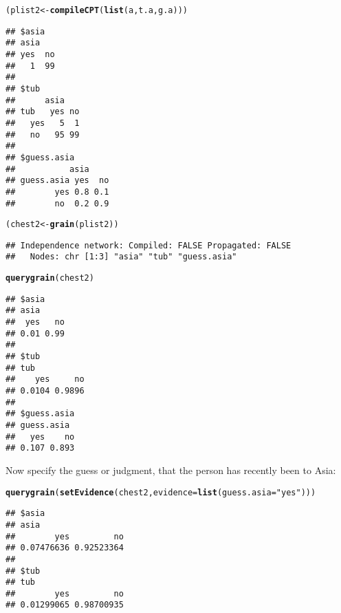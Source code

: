 \documentclass[10pt]{article}\usepackage[]{graphicx}\usepackage[]{color}
\makeatletter
\newcommand{\hlstr}[1]{\textcolor[rgb]{0.192,0.494,0.8}{#1}}%
\newcommand{\hlstd}[1]{\textcolor[rgb]{0.345,0.345,0.345}{#1}}%
\newcommand{\hlkwb}[1]{\textcolor[rgb]{0.69,0.353,0.396}{#1}}%
\newcommand{\hlkwc}[1]{\textcolor[rgb]{0.333,0.667,0.333}{#1}}%
\newcommand{\hlkwd}[1]{\textcolor[rgb]{0.737,0.353,0.396}{\textbf{#1}}}%
\newenvironment{kframe}{%
 \def\at@end@of@kframe{}%
 \ifinner\ifhmode%
  \def\at@end@of@kframe{\end{minipage}}%
  \begin{minipage}{\columnwidth}%
 \fi\fi%
 \def\FrameCommand##1{\hskip\@totalleftmargin \hskip-\fboxsep
 \colorbox{shadecolor}{##1}\hskip-\fboxsep
     \hskip-\linewidth \hskip-\@totalleftmargin \hskip\columnwidth}%
 \MakeFramed {\advance\hsize-\width
   \@totalleftmargin\z@ \linewidth\hsize
   \@setminipage}}%
 {\par\unskip\endMakeFramed%
 \at@end@of@kframe}
\newenvironment{knitrout}{}{} %
\makeatother
\begin{document}
\begin{knitrout}
\color{fgcolor}\begin{kframe}
\begin{alltt}
\hlstd{(plist2} \hlkwb{<-} \hlkwd{compileCPT}\hlstd{(}\hlkwd{list}\hlstd{(a, t.a, g.a )))}
\end{alltt}
\begin{verbatim}
## $asia
## asia
## yes  no 
##   1  99 
## 
## $tub
##      asia
## tub   yes no
##   yes   5  1
##   no   95 99
## 
## $guess.asia
##           asia
## guess.asia yes  no
##        yes 0.8 0.1
##        no  0.2 0.9
\end{verbatim}
\begin{alltt}
\hlstd{(chest2} \hlkwb{<-} \hlkwd{grain}\hlstd{(plist2))}
\end{alltt}
\begin{verbatim}
## Independence network: Compiled: FALSE Propagated: FALSE 
##   Nodes: chr [1:3] "asia" "tub" "guess.asia"
\end{verbatim}
\begin{alltt}
\hlkwd{querygrain}\hlstd{( chest2 )}
\end{alltt}
\begin{verbatim}
## $asia
## asia
##  yes   no 
## 0.01 0.99 
## 
## $tub
## tub
##    yes     no 
## 0.0104 0.9896 
## 
## $guess.asia
## guess.asia
##   yes    no 
## 0.107 0.893
\end{verbatim}
\end{kframe}
\end{knitrout}


Now specify the guess or judgment, that the person has recently been
to Asia:

\begin{knitrout}
\color{fgcolor}\begin{kframe}
\begin{alltt}
\hlkwd{querygrain}\hlstd{(}\hlkwd{setEvidence}\hlstd{(chest2,} \hlkwc{evidence}\hlstd{=}\hlkwd{list}\hlstd{(}\hlkwc{guess.asia}\hlstd{=}\hlstr{"yes"}\hlstd{)))}
\end{alltt}
\begin{verbatim}
## $asia
## asia
##        yes         no 
## 0.07476636 0.92523364 
## 
## $tub
## tub
##        yes         no 
## 0.01299065 0.98700935
\end{verbatim}
\end{kframe}
\end{knitrout}
\end{document}
